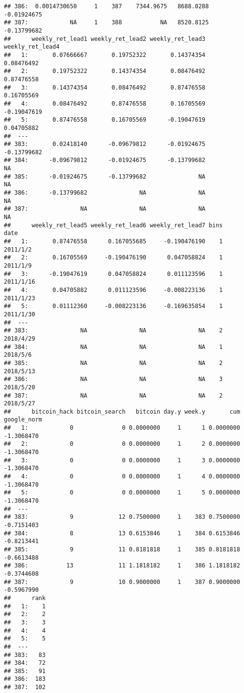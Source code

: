 \documentclass[
]{article}
\begin{document}
\begin{verbatim}
## 386:  0.0014730650     1    387    7344.9675   8688.0288 -0.01924675
## 387:            NA     1    388           NA   8520.8125 -0.13799682
##      weekly_ret_lead1 weekly_ret_lead2 weekly_ret_lead3 weekly_ret_lead4
##   1:       0.07666667       0.19752322       0.14374354       0.08476492
##   2:       0.19752322       0.14374354       0.08476492       0.87476558
##   3:       0.14374354       0.08476492       0.87476558       0.16705569
##   4:       0.08476492       0.87476558       0.16705569      -0.19047619
##   5:       0.87476558       0.16705569      -0.19047619       0.04705882
##  ---                                                                    
## 383:       0.02418140      -0.09679812      -0.01924675      -0.13799682
## 384:      -0.09679812      -0.01924675      -0.13799682               NA
## 385:      -0.01924675      -0.13799682               NA               NA
## 386:      -0.13799682               NA               NA               NA
## 387:               NA               NA               NA               NA
##      weekly_ret_lead5 weekly_ret_lead6 weekly_ret_lead7 bins      date
##   1:       0.87476558      0.167055685     -0.190476190    1  2011/1/2
##   2:       0.16705569     -0.190476190      0.047058824    1  2011/1/9
##   3:      -0.19047619      0.047058824      0.011123596    1 2011/1/16
##   4:       0.04705882      0.011123596     -0.008223136    1 2011/1/23
##   5:       0.01112360     -0.008223136     -0.169635854    1 2011/1/30
##  ---                                                                  
## 383:               NA               NA               NA    2 2018/4/29
## 384:               NA               NA               NA    1  2018/5/6
## 385:               NA               NA               NA    2 2018/5/13
## 386:               NA               NA               NA    3 2018/5/20
## 387:               NA               NA               NA    2 2018/5/27
##      bitcoin_hack bitcoin_search   bitcoin day.y week.y       cum google_norm
##   1:            0              0 0.0000000     1      1 0.0000000  -1.3068470
##   2:            0              0 0.0000000     1      2 0.0000000  -1.3068470
##   3:            0              0 0.0000000     1      3 0.0000000  -1.3068470
##   4:            0              0 0.0000000     1      4 0.0000000  -1.3068470
##   5:            0              0 0.0000000     1      5 0.0000000  -1.3068470
##  ---                                                                         
## 383:            9             12 0.7500000     1    383 0.7500000  -0.7151403
## 384:            8             13 0.6153846     1    384 0.6153846  -0.8213441
## 385:            9             11 0.8181818     1    385 0.8181818  -0.6613488
## 386:           13             11 1.1818182     1    386 1.1818182  -0.3744608
## 387:            9             10 0.9000000     1    387 0.9000000  -0.5967990
##      rank
##   1:    1
##   2:    2
##   3:    3
##   4:    4
##   5:    5
##  ---     
## 383:   83
## 384:   72
## 385:   91
## 386:  183
## 387:  102
\end{verbatim}
\end{document}

